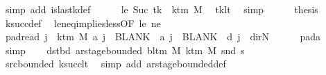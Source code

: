 \begin{isabellebody}
\ {\isacharparenleft}{\kern0pt}simp\ add{\isacharcolon}{\kern0pt}\ is{\isacharunderscore}{\kern0pt}last{\isacharunderscore}{\kern0pt}k{\isacharunderscore}{\kern0pt}def{\isacharparenright}{\kern0pt}\isanewline
\ \ \ \ \isamarkupfalse%
\ le{\isacharcolon}{\kern0pt}\ {\isachardoublequoteopen}Suc\ tk\ {\isasymle}\ k{\isacharunderscore}{\kern0pt}tm\ M{\isachardoublequoteclose}\ \isamarkupfalse%
\ tk{\isacharunderscore}{\kern0pt}lt\ \isamarkupfalse%
\ simp\isanewline
\ \ \ \ \isamarkupfalse%
\ {\isacharquery}{\kern0pt}thesis\ \isamarkupfalse%
\ k{\isacharunderscore}{\kern0pt}succ{\isacharunderscore}{\kern0pt}def\ \isamarkupfalse%
\ le{\isacharunderscore}{\kern0pt}neq{\isacharunderscore}{\kern0pt}implies{\isacharunderscore}{\kern0pt}less{\isacharbrackleft}{\kern0pt}OF\ le\ ne{\isacharbrackright}{\kern0pt}\ \isakeywordONE{{\isachardot}{\kern0pt}}\isamarkupfalse%
\isanewline
\ \ \isamarkupfalse%
\isanewline
\ \ \isamarkupfalse%
\ pad{\isacharunderscore}{\kern0pt}read{\isacharcolon}{\kern0pt}\ {\isachardoublequoteopen}{\isasymforall}j\ {\isasymge}\ k{\isacharunderscore}{\kern0pt}tm\ M{\isachardot}{\kern0pt}\ {\isacharquery}{\kern0pt}a\ j\ {\isacharequal}{\kern0pt}\ BLANK{}\ {\isasymand}\ {\isacharquery}{\kern0pt}a\ j\ {\isacharequal}{\kern0pt}\ BLANK{}\ {\isasymand}\ {\isacharquery}{\kern0pt}d\ j\ {\isacharequal}{\kern0pt}\ dir{\isachardot}{\kern0pt}N{\isachardoublequoteclose}\isanewline
\ \ \ \ \isamarkupfalse%
\ pad{\isacharunderscore}{\kern0pt}a\ \isamarkupfalse%
\ simp\isanewline
\ \ \isamarkupfalse%
\ dst{\isacharunderscore}{\kern0pt}bd{\isacharcolon}{\kern0pt}\ {\isachardoublequoteopen}ar{\isacharunderscore}{\kern0pt}stage{\isacharunderscore}{\kern0pt}bounded\ {\isacharparenleft}{\kern0pt}bl{\isacharunderscore}{\kern0pt}tm\ M{\isacharparenright}{\kern0pt}\ {\isacharparenleft}{\kern0pt}k{\isacharunderscore}{\kern0pt}tm\ M{\isacharparenright}{\kern0pt}\ {\isacharparenleft}{\kern0pt}snd\ {\isacharquery}{\kern0pt}s{\isacharprime}{\kern0pt}{\isacharparenright}{\kern0pt}{\isachardoublequoteclose}\isanewline
\ \ \ \ \isamarkupfalse%
\ src{\isacharunderscore}{\kern0pt}bounded\ ksucc{\isacharunderscore}{\kern0pt}lt\ \isamarkupfalse%
\ {\isacharparenleft}{\kern0pt}simp\ add{\isacharcolon}{\kern0pt}\ ar{\isacharunderscore}{\kern0pt}stage{\isacharunderscore}{\kern0pt}bounded{\isacharunderscore}{\kern0pt}def{\isacharparenright}{\kern0pt}\isanewline

\end{isabellebody}
